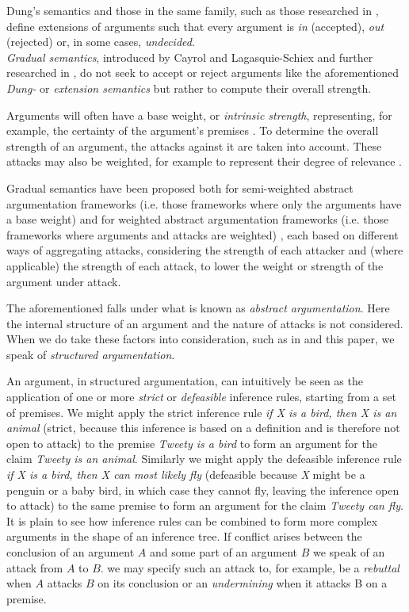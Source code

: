 \documentclass[runningheads]{llncs}
\begin{document}
Dung's semantics \cite{DBLP:journals/ai/Dung95} and those in the same family, such as those researched in  \cite{DBLP:journals/amai/AmgoudC02}, define extensions of arguments such that every argument is \textit{in} (accepted), \textit{out} (rejected) or, in some cases,  \textit{undecided}.\\
\textit{Gradual semantics}, introduced by Cayrol and Lagasquie-Schiex \cite{DBLP:journals/jair/CayrolL05} and further researched in \cite{DBLP:conf/ijcai/AmgoudBDV17}, do not seek to accept or reject arguments like the aforementioned \textit{Dung-} or \textit{extension semantics} but rather to compute their overall strength.

Arguments will often have a base weight, or \textit{intrinsic strength}, representing, for example, the certainty of the argument's premises \cite{DBLP:conf/uai/BenferhatDP93}. To determine the overall strength of an argument, the attacks against it are taken into account. These attacks may also be weighted, for example to represent their degree of relevance \cite{DBLP:journals/ai/DunneHMPW11}.

Gradual semantics have been proposed both for semi-weighted abstract argumentation frameworks (i.e. those frameworks where only the arguments have a base weight) \cite{DBLP:conf/ijcai/AmgoudBDV17} and for weighted abstract argumentation frameworks (i.e. those frameworks where arguments and attacks are weighted) \cite{DBLP:conf/atal/AmgoudD19}, each based on different ways of aggregating attacks, considering the strength of each attacker and (where applicable) the strength of each attack, to lower the weight or strength of the argument under attack.

The aforementioned falls under what is known as \textit{abstract argumentation}. Here the internal structure of an argument and the nature of attacks is not considered. When we do take these factors into consideration, such as in \cite{DBLP:journals/argcom/ModgilP14,DBLP:conf/kr/Prakken18} and this paper, we speak of \textit{structured argumentation}.

An argument, in structured argumentation, can intuitively be seen as the application of one or more \textit{strict} or \textit{defeasible} inference rules, starting from a set of premises. We might apply the strict inference rule \textit{if X is a bird, then X is an animal} (strict, because this inference is based on a definition and is therefore not open to attack) to the premise \textit{Tweety is a bird} to form an argument for the claim \textit{Tweety is an animal}. Similarly we might apply the defeasible inference rule \textit{if X is a bird, then X can most likely fly} (defeasible because \textit{X} might be a penguin or a baby bird, in which case they cannot fly, leaving the inference open to attack) to the same premise to form an argument for the claim \textit{Tweety can fly}. It is plain to see how inference rules can be combined to form more complex arguments in the shape of an inference tree. If conflict arises between the conclusion of an argument $A$ and some part of an argument $B$ we speak of an attack from $A$ to $B$. we may specify such an attack to, for example, be a \textit{rebuttal} when $A$ attacks $B$ on its conclusion or an \textit{undermining} when it attacks B on a premise. 
\end{document}
